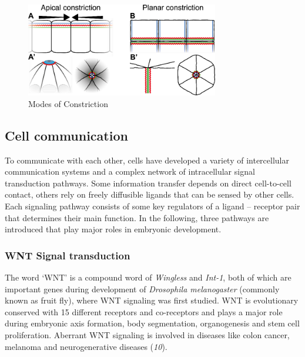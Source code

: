 \documentclass[11pt,singlespacinge,twoside]{reedthesis} %
\begin{document}
\begin{figure}

{\centering \includegraphics[width=0.75\textwidth]{figures/intro/constriction} 

}

\caption{Modes of Constriction}\label{fig:constr}
\end{figure}
\hypertarget{cell-communication}{%
\subsection{Cell communication}\label{cell-communication}}

To communicate with each other, cells have developed a variety of intercellular communication systems and a complex network of intracellular signal transduction pathways. Some information transfer depends on direct cell-to-cell contact, others rely on freely diffusible ligands that can be sensed by other cells. Each signaling pathway consists of some key regulators of a ligand -- receptor pair that determines their main function. In the following, three pathways are introduced that play major roles in embryonic development.

\hypertarget{wnt-signal-transduction}{%
\subsubsection{WNT Signal transduction}\label{wnt-signal-transduction}}

The word `WNT' is a compound word of \emph{Wingless} and \emph{Int-1}, both of which are important genes during development of \emph{Drosophila melanogaster} (commonly known as fruit fly), where WNT signaling was first studied. WNT is evolutionary conserved with 15 different receptors and co-receptors and plays a major role during embryonic axis formation, body segmentation, organogenesis and stem cell proliferation. Aberrant WNT signaling is involved in diseases like colon cancer, melanoma and neurogenerative diseases (\emph{10}).
\end{document}
